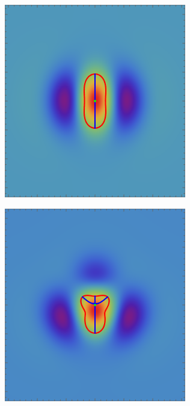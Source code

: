 \documentclass[a4paper, 11pt]{article}
\begin{document}
\begin{figure}
\centering
\begin{subfigure}[b]{0.24\textwidth}
\includegraphics[width=\textwidth]{Cusp_mean_delta}
\end{subfigure}
\begin{subfigure}[b]{0.24\textwidth}
\includegraphics[width=\textwidth]{Swallowtail_mean_delta}

\end{subfigure}
\end{figure}
\end{document}
